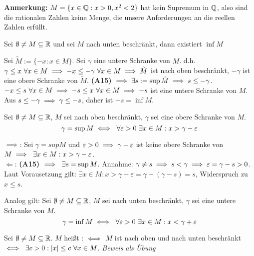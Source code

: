 \documentclass[a4paper,twoside,DIV15,BCOR12mm]{scrbook}
\begin{document}
\textbf{Anmerkung:} $M = \{x\in\mathbb{Q}: x > 0, x^2 < 2\}$ hat kein Supremum in $\mathbb{Q}$, also sind die rationalen Zahlen keine Menge, die unsere Anforderungen an die reellen Zahlen erfüllt.

\begin{satz}
Sei $ \emptyset \ne M \subseteq \mathbb{R}$ und sei $M$ nach unten beschränkt, dann existiert $\inf{M}$
\end{satz}

\begin{beweis} Sei $\tilde M := \{ -x : x\in M\}$. Sei $\gamma$ eine untere Schranke von $M$. d.h. $\gamma \le x \ \forall x \in M \implies -x \le -\gamma \ \forall x \in M \implies \tilde M $ ist nach oben beschränkt, $-\gamma$ ist eine obere Schranke von $\tilde M$. \textbf{(A15)} $\implies \exists s := \sup{\tilde M} \implies s \le - \gamma$. $-x \le s \ \forall x \in M \folgt -s \le x \ \forall x \in M \folgt -s $ ist eine untere Schranke von $M$. Aus $s \le -\gamma \implies \gamma \le -s$, daher ist $-s = \inf{M}$.
\end{beweis}

\begin{satz}
Sei $\emptyset \ne M \subseteq \mathbb{R}$, $M$ sei nach oben beschränkt, $\gamma$ sei eine obere Schranke von $M$.
\[ \gamma = \sup{M} \equizu \ \forall\varepsilon > 0 \ \exists x \in M: x > \gamma - \varepsilon \]
\end{satz}

\begin{beweis} \glqq$\implies$\grqq: Sei $\gamma = sup{M}$ und $\varepsilon > 0 \implies \gamma - \varepsilon$ ist keine obere Schranke von $M \implies \ \exists x\in M: x > \gamma - \varepsilon$. \\
 \glqq$\Leftarrow$\grqq: \textbf{(A15)} $\implies \ \exists s = \sup{M}$. Annahme: $\gamma \ne s \implies s < \gamma \implies \varepsilon = \gamma - s > 0$. Laut Vorausetzung gilt: $\exists x \in M: x > \gamma - \varepsilon = \gamma - (\gamma - s) = s$, Widerspruch zu $x \le s$.
\end{beweis}

Analog gilt: Sei $\emptyset \ne M \subseteq \mathbb{R}$, $M$ sei nach unten beschränkt, $\gamma$ sei eine untere Schranke von $M$.
\[ \gamma = \inf{M} \equizu \ \forall\varepsilon > 0 \ \exists x \in M: x < \gamma + \varepsilon \]

\begin{definition}
Sei $\emptyset \ne M \subseteq \mathbb{R}$. $M$ heißt : $\iff$ $M$ ist nach oben und nach unten beschränkt $\iff \ \exists c > 0: |x| \le c \ \forall x\in M$. \textit{Beweis als Übung}
\end{definition}
\end{document}
